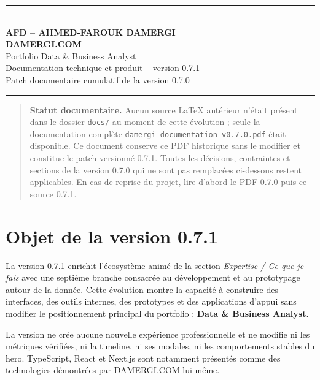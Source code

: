 \documentclass[11pt,a4paper]{article}
\newcommand{\tech}[1]{\texttt{#1}}
\newcommand{\version}{0.7.1}
\begin{document}
\begin{center}
  {\color{damergigold}\rule{0.72\textwidth}{0.8pt}}\\[1.2em]
  {\Large\bfseries AFD -- AHMED-FAROUK DAMERGI}\\[1.1em]
  {\Huge\bfseries DAMERGI.COM}\\[0.5em]
  {\Large Portfolio Data \& Business Analyst}\\[1.2em]
  {\large Documentation technique et produit -- version \version}\\[0.8em]
  {\small Patch documentaire cumulatif de la version 0.7.0}\\[1.2em]
  {\color{damergigold}\rule{0.72\textwidth}{0.8pt}}
\end{center}

\vspace{1em}

\begin{quote}
\textbf{Statut documentaire.} Aucun source LaTeX antérieur n'était présent dans le dossier
\tech{docs/} au moment de cette évolution ; seule la documentation complète
\tech{damergi\_documentation\_v0.7.0.pdf} était disponible. Ce document conserve ce PDF
historique sans le modifier et constitue le patch versionné 0.7.1. Toutes les décisions,
contraintes et sections de la version 0.7.0 qui ne sont pas remplacées ci-dessous restent
applicables. En cas de reprise du projet, lire d'abord le PDF 0.7.0 puis ce source 0.7.1.
\end{quote}

\tableofcontents

\section{Objet de la version 0.7.1}

La version 0.7.1 enrichit l'écosystème animé de la section \emph{Expertise / Ce que je fais}
avec une septième branche consacrée au développement et au prototypage autour de la donnée.
Cette évolution montre la capacité à construire des interfaces, des outils internes, des
prototypes et des applications d'appui sans modifier le positionnement principal du portfolio :
\textbf{Data \& Business Analyst}.

La version ne crée aucune nouvelle expérience professionnelle et ne modifie ni les métriques
vérifiées, ni la timeline, ni ses modales, ni les comportements stables du hero. TypeScript,
React et Next.js sont notamment présentés comme des technologies démontrées par
DAMERGI.COM lui-même.
\end{document}
